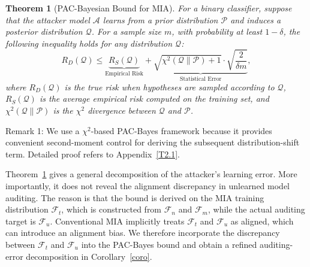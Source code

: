 \documentclass{article}
\theoremstyle{plain}
\newtheorem{theorem}{Theorem}[section]
\theoremstyle{definition}
\theoremstyle{remark}
\begin{document}
\begin{theorem}[PAC-Bayesian Bound for MIA]\label{2.1}
    For a binary classifier, suppose that the attacker model $\mathcal A$ learns from a prior distribution $\mathcal P$ and induces a posterior distribution $\mathcal Q$. For a sample size $m$, with probability at least $1-\delta$, the following inequality holds for any distribution $\mathcal Q$:
    \begin{equation}
        R_D(\mathcal Q)
        \leq
        \underbrace{R_S(\mathcal Q)}_{\text{Empirical Risk}}
        +
        \underbrace{
        \sqrt{\chi^2(\mathcal Q \| \mathcal P)+1}
        \cdot
        \sqrt{\frac{2}{\delta m}}
        }_{\text{Statistical Error}},
    \end{equation}
where $R_D(\mathcal Q)$ is the true risk when hypotheses are sampled according to $\mathcal Q$, $R_S(\mathcal Q)$ is the average empirical risk computed on the training set, and $\chi^2(\mathcal Q\|\mathcal P)$ is the $\chi^2$ divergence between $\mathcal Q$ and $\mathcal P$.
\end{theorem}

Remark 1: We use a $\chi^2$-based PAC-Bayes framework because it provides convenient second-moment control for deriving the subsequent distribution-shift term.
Detailed proof refers to Appendix~\ref{T2.1}.

Theorem~\ref{2.1} gives a general decomposition of the attacker’s learning error. More importantly, it does not reveal the alignment discrepancy in unlearned model auditing. The reason is that the bound is derived on the MIA training distribution $\mathcal F_t$, which is constructed from $\mathcal F_n$ and $\mathcal F_m$, while the actual auditing target is $\mathcal F_u$. Conventional MIA implicitly treats $\mathcal F_t$ and $\mathcal F_u$ as aligned, which can introduce an alignment bias. We therefore incorporate the discrepancy between $\mathcal F_t$ and $\mathcal F_u$ into the PAC-Bayes bound and obtain a refined auditing-error decomposition in Corollary~\ref{coro}.
\end{document}
